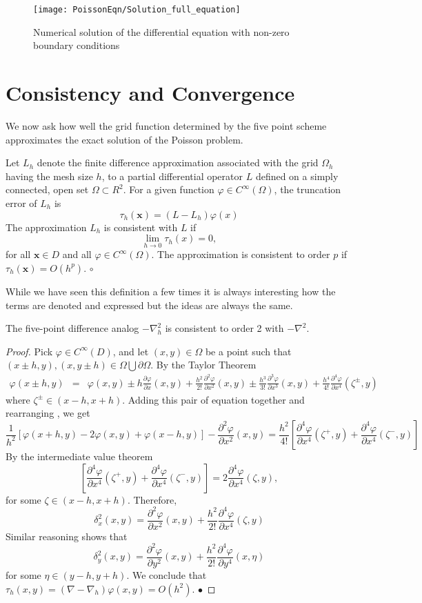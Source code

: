 \begin{figure}[H]
  \caption{Numerical solution of the differential equation with non-zero boundary conditions }
  \centering
    \texttt{[image: PoissonEqn/Solution\_full\_equation]}
\end{figure}

\section{Consistency and Convergence}
We now ask how well the grid function determined by the five point scheme approximates
the exact solution of the Poisson problem.
\begin{definition}
Let $L_h$ denote the finite difference approximation associated with the grid $\Omega_h$ having the mesh size $h$, to a partial differential operator $L$ defined on
a simply connected, open set $\Omega \subset R^2$. For a given function $\varphi\in C^{\infty}(\Omega)$,
the truncation error of $L_h$ is
\[\tau_{h}(\mathbf{x})=(L-L_h)\varphi(x) \]
The approximation $L_h$ is consistent with $L$ if
\[ \lim_{h\rightarrow 0}\tau_h(x)=0,\]
for all $\mathbf{x} \in D$ and all $\varphi \in C^{\infty}(\Omega)$. The approximation is consistent to order $p$ if $\tau_h(\mathbf{x})=O(h^p)$.
$\circ$
\end{definition}
While we have seen this definition a few times it is always interesting how the
terms are denoted and expressed but the ideas are always the same.
\begin{proposition}
The five-point difference analog $-\nabla^2_h$ is consistent to order 2 with $-\nabla^2$.
\end{proposition}
\begin{proof}
Pick $\varphi \in C^{\infty}(D)$, and let $(x,y) \in \Omega$ be a point such that $(x\pm h, y),(x,y \pm h) \in \Omega\bigcup \partial\Omega$.  By the Taylor Theorem
\begin{eqnarray*}
\varphi(x\pm h,y)&=&\varphi(x,y) \pm h \frac{\partial \varphi}{\partial x}(x,y)+\frac{h^2}{2!}\frac{\partial^2 \varphi}{\partial x^2}(x,y) \pm\frac{h^3}{3!}\frac{\partial^3 \varphi}{\partial x^3}(x,y)+\frac{h^4}{4!}\frac{\partial^4 \varphi}{\partial x^4}(\zeta^{\pm},y)
\end{eqnarray*}
where $\zeta^{\pm} \in (x-h,x+h)$. Adding this pair of equation together and rearranging , we get
\[\frac{1}{h^2}[\varphi(x+h,y)-2\varphi(x,y)+\varphi(x-h,y) ] -\frac{\partial^2 \varphi}{\partial x^2}(x,y)=\frac{h^2}{4!}\left[\frac{\partial^4 \varphi}{\partial x^4}(\zeta^{+},y)+
\frac{\partial^4 \varphi}{\partial x^4}(\zeta^{-},y)
 \right]
\]
By the intermediate value theorem
\[\left[\frac{\partial^4 \varphi}{\partial x^4}(\zeta^{+},y)+
\frac{\partial^4 \varphi}{\partial x^4}(\zeta^{-},y)
 \right]
=2\frac{\partial^4 \varphi}{\partial x^4}(\zeta,y),\]
for some $\zeta \in (x-h,x+h)$.  Therefore,
\[\delta_x^2(x,y)
=\frac{\partial^2 \varphi}{\partial x^2}(x,y)+\frac{h^2}{2!}\frac{\partial^4 \varphi}{\partial x^4}(\zeta,y)
\]
Similar reasoning shows that
\[\delta_y^2(x,y)
=\frac{\partial^2 \varphi}{\partial y^2}(x,y)+\frac{h^2}{2!}\frac{\partial^4 \varphi}{\partial y^4}(x,\eta)
\]
for some $\eta \in (y-h,y+h)$. We conclude that $\tau_h(x,y)=(\nabla-\nabla_h)\varphi(x,y)=O(h^2).$
$\bullet$\end{proof}

